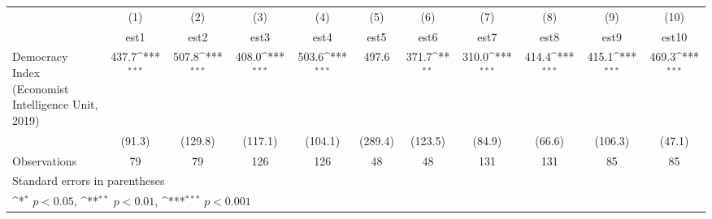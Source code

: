 {
\def\sym#1{\ifmmode^{#1}\else\(^{#1}\)\fi}
\begin{tabular}{l*{10}{c}}
\hline\hline
                    &\multicolumn{1}{c}{(1)}         &\multicolumn{1}{c}{(2)}         &\multicolumn{1}{c}{(3)}         &\multicolumn{1}{c}{(4)}         &\multicolumn{1}{c}{(5)}         &\multicolumn{1}{c}{(6)}         &\multicolumn{1}{c}{(7)}         &\multicolumn{1}{c}{(8)}         &\multicolumn{1}{c}{(9)}         &\multicolumn{1}{c}{(10)}         \\
                    &        est1         &        est2         &        est3         &        est4         &        est5         &        est6         &        est7         &        est8         &        est9         &       est10         \\
\hline
Democracy Index (Economist Intelligence Unit, 2019)&       437.7\sym{***}&       507.8\sym{***}&       408.0\sym{***}&       503.6\sym{***}&       497.6         &       371.7\sym{**} &       310.0\sym{***}&       414.4\sym{***}&       415.1\sym{***}&       469.3\sym{***}\\
                    &      (91.3)         &     (129.8)         &     (117.1)         &     (104.1)         &     (289.4)         &     (123.5)         &      (84.9)         &      (66.6)         &     (106.3)         &      (47.1)         \\
\hline
Observations        &          79         &          79         &         126         &         126         &          48         &          48         &         131         &         131         &          85         &          85         \\
\hline\hline
\multicolumn{11}{l}{\footnotesize Standard errors in parentheses}\\
\multicolumn{11}{l}{\footnotesize \sym{*} \(p<0.05\), \sym{**} \(p<0.01\), \sym{***} \(p<0.001\)}\\
\end{tabular}
}
